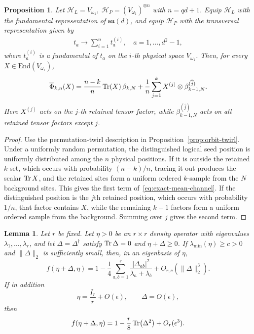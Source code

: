 \documentclass[10pt,twocolumn,superscriptaddress,aps,amsmath,amssymb,citeautoscript,floatfix,prx]{revtex4-2}
\theoremstyle{plain}
\theoremstyle{plain}
\theoremstyle{plain}
\theoremstyle{plain}
\theoremstyle{plain}
\theoremstyle{plain}
\newcommand{\End}{\mathrm{End}}
\theoremstyle{plain}
\newtheorem{smproposition}[smtheorem]{Proposition}
\newtheorem{smlemma}[smtheorem]{Lemma}
\theoremstyle{definition}
\theoremstyle{plain}
\begin{document}
\begin{appendix}
\begin{smproposition}
\label{prop:exact-mean-channel}
Let
    $
        \mathcal H_L=V_{\omega_1},\;
        \mathcal H_P=(V_{\omega_1})^{\otimes n}
    $
    with $n=qd+1$.
    Equip \(\mathcal H_L\) with the fundamental representation of
    \(\mathfrak{su}(d)\), and equip \(\mathcal H_P\) with the transversal
    representation given by
    \begin{equation}
    \begin{gathered}
    t_a \rightarrow \sum_{i=1}^n t_a^{(i)}, \quad a=1,\ldots,d^2-1,
    \end{gathered}
    \end{equation}
    where $t_a^{(i)}$ is a fundamental of $t_a$ on the $i$-th physical space $V_{\omega_1}$. Then, for every $X\in\End(V_{\omega_1})$,
\begin{equation}
\label{eq:exact-mean-channel}
    \overline{\Phi}_{k,n}(X)
    =
    \frac{n-k}{n}\Tr(X)\,\beta_{k,N}
    +
    \frac{1}{n}\sum_{j=1}^k
    X^{(j)}\otimes
    \beta_{k-1,N}^{(\widehat j)}
    .
\end{equation}
Here $X^{(j)}$ acts on the $j$-th retained tensor factor, while
$\beta_{k-1,N}^{(\widehat j)}$ acts on all retained tensor factors
except $j$.
\end{smproposition}

\begin{proof}
Use the permutation-twirl description in Proposition~\ref{prop:orbit-twirl}. Under a uniformly random permutation, the distinguished logical seed position is uniformly 
distributed among the $n$ physical positions.
If it is outside the retained $k$-set, which occurs with probability $(n-k)/n$, tracing it out produces the scalar $\Tr X$, 
and the retained sites form a uniform ordered $k$-sample from the $N$ background sites. This gives the first term of~\eqref{eq:exact-mean-channel}.
If the distinguished position is the $j$th retained position, which occurs with probability $1/n$, that factor contains $X$, while the remaining $k-1$ factors form a uniform ordered sample from the background. 
Summing over $j$ gives the second term.  
\end{proof}

\begin{smlemma}
\label{lem:bures-expansion}
Let $r$ be fixed.  Let $\eta>0$ be an $r\times r$ density operator with eigenvalues $\lambda_1,\ldots,\lambda_r$, and let $\Delta=\Delta^\dagger$ satisfy $\Tr\Delta=0$ and $\eta+\Delta\ge0$. 
If $\lambda_{\min}(\eta)\ge c>0$ and $\|\Delta\|_2$ is sufficiently small, then, in an eigenbasis of $\eta$,
\begin{equation}
\label{eq:general-bures-expansion}
  f(\eta+\Delta,\eta)
  =1-\frac14\sum_{a,b=1}^r
      \frac{|\Delta_{ab}|^2}{\lambda_a+\lambda_b}
      +O_{r,c}(\|\Delta\|_2^3).
\end{equation}
If in addition
\[
  \eta=\frac{I_r}{r}+O(\epsilon),
  \qquad
  \Delta=O(\epsilon),
\]
then
\begin{equation}
\label{eq:mixed-bures-expansion}
  f(\eta+\Delta,\eta)
  =1-\frac r8\Tr(\Delta^2)+O_r(\epsilon^3).
\end{equation}
\end{smlemma}


\end{appendix}
\end{document}
